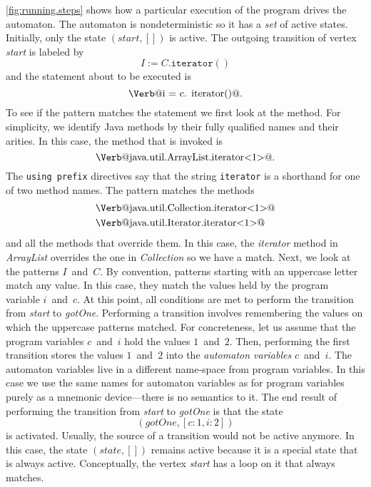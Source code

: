\documentclass[preprint]{sigplanconf} %
\makeatletter
\newcommand{\verbline}[2][]{\[\text{\Verb@#2@}#1\]}
\theoremstyle{definition}
\makeatother
\begin{document}
\autoref{fig:running.steps} shows how a particular execution of the program drives the automaton.
The automaton is nondeterministic so it has a \emph{set} of active states.
Initially, only the state $(\mathit{start},[])$ is active.
The outgoing transition of vertex \textit{start} is labeled by \[I:=C.\mathtt{iterator}()\] and the statement about to be executed is \verbline[.]{i = c.\PY{n+na}{iterator}()}
To see if the pattern matches the statement we first look at the method.
For simplicity, we identify Java methods by their fully qualified names and their arities.
In this case, the method that is invoked is \verbline[.]{java.util.ArrayList.iterator<1>}
The \texttt{using prefix} directives say that the string \texttt{iterator} is a shorthand for one of two method names.
The pattern matches the methods
\begin{align*}
&\text{\Verb@java.util.Collection.iterator<1>@} \\
&\text{\Verb@java.util.Iterator.iterator<1>@}
\end{align*}
and all the methods that override them.
In this case, the \textit{iterator} method in \textit{ArrayList} overrides the one in \textit{Collection} so we have a match.
Next, we look at the patterns $I$~and~$C$.
By convention, patterns starting with an uppercase letter match any value.
In this case, they match the values held by the program variable $i$~and~$c$.
At this point, all conditions are met to perform the transition from \textit{start} to \textit{gotOne}.
Performing a transition involves remembering the values on which the uppercase patterns matched.
For concreteness, let us assume that the program variables $c$~and~$i$ hold the values $1$~and~$2$.
Then, performing the first transition stores the values $1$~and~$2$ into the \emph{automaton variables} $c$~and~$i$.
The automaton variables live in a different name-space from program variables.
In this case we use the same names for automaton variables as for program variables purely as a mnemonic device---there is no semantics to it.
The end result of performing the transition from \textit{start} to \textit{gotOne} is that the state \[(\mathit{gotOne},[c:1,i:2])\] is activated.
Usually, the source of a transition would not be active anymore.
In this case, the state $(\mathit{state},[])$ remains active because it is a special state that is always active.
Conceptually, the vertex \textit{start} has a loop on it that always matches.
\end{document}
